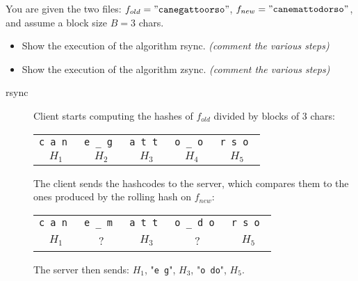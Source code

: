 \exercise

You are given the two files: $f_{old} = \mathtt{"cane gatto orso"}$, $f_{new} =
\mathtt{"cane matto dorso"}$, and assume a block size $B = 3$ chars.
%
\begin{itemize}

  \item Show the execution of the algorithm rsync.
  \emph{(comment the various steps)}

  \item Show the execution of the algorithm zsync.
  \emph{(comment the various steps)}

\end{itemize}

\solution

\begin{description}

  \item[rsync] Client starts computing the hashes of $f_{old}$ divided by blocks
  of 3 chars:
  \begin{table}[h]
    \centering
    \begin{tabular}{|c|c|c|c|c|}
      \tt{c a n} & \tt{e \_ g} & \tt{a t t} & \tt{o \_ o} & \tt{r s o} \\
      $H_1$ & $H_2$ & $H_3$ & $H_4$ & $H_5$ \\
    \end{tabular}
  \end{table}
  The client sends the hashcodes to the server, which compares them to the ones
  produced by the rolling hash on $f_{new}$:
  \begin{table}[H]
    \centering
    \begin{tabular}{|c|c|c|c|c|}
      \tt{c a n} & \tt{e \_ m} & \tt{a t t} & \tt{o \_ d o} & \tt{r s o} \\
      $H_1$ & ? & $H_3$ & ? & $H_5$ \\
    \end{tabular}
  \end{table}
  The server then sends: $H_1$, "\texttt{e g}", $H_3$, "\texttt{o do}", $H_5$.


\end{description}
